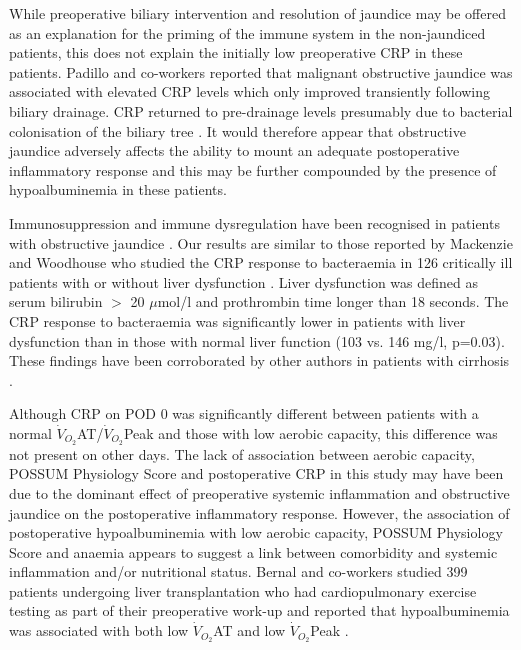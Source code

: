 While preoperative biliary intervention and resolution of jaundice may be offered as an explanation for the priming of the immune system in the non-jaundiced patients, this does not explain the initially low preoperative CRP in these patients.
Padillo and co-workers reported that malignant obstructive jaundice was associated with elevated CRP levels which only improved transiently following biliary drainage.
CRP returned to pre-drainage levels presumably due to bacterial colonisation of the biliary tree  \parencite{padillo_effect_2002, padillo_cytokines_2001}.
It would therefore appear that obstructive jaundice adversely affects the ability to mount an adequate postoperative inflammatory response and this may be further compounded by the presence of hypoalbuminemia in these patients.

Immunosuppression and immune dysregulation have been recognised in patients with obstructive jaundice \parencite{scott-conner_pathophysiology_1994}.
Our results are similar to those reported by Mackenzie and Woodhouse who studied the CRP response to bacteraemia in 126 critically ill patients with or without liver dysfunction \parencite{mackenzie_c-reactive_2006}. 
Liver dysfunction was defined as serum bilirubin $>$ 20 $\mu$mol/l and prothrombin time longer than 18 seconds. 
The CRP response to bacteraemia was significantly lower in patients with liver dysfunction than in those with normal liver function (103 vs. 146 mg/l, p=0.03). 
These findings have been corroborated by other authors in patients with cirrhosis \parencite{pieri_c-reactive_2014, janum_c-reactive_2011}.

Although CRP on POD 0 was significantly different between patients with a normal $\dot{V}_{O_2}$AT/$\dot{V}_{O_2}$Peak and those with low aerobic capacity, this difference was not present on other days. 
The lack of association between aerobic capacity, POSSUM Physiology Score and postoperative CRP in this study may have been due to the dominant effect of preoperative systemic inflammation and obstructive jaundice on the postoperative inflammatory response.
However, the association of postoperative hypoalbuminemia with low aerobic capacity, POSSUM Physiology Score and anaemia appears to suggest a link between comorbidity and systemic inflammation and/or nutritional status.
Bernal and co-workers studied 399 patients undergoing liver transplantation who had cardiopulmonary exercise testing as part of their preoperative work-up and reported that hypoalbuminemia was associated with both low $\dot{V}_{O_2}$AT and low $\dot{V}_{O_2}$Peak \parencite{bernal_aerobic_2014}.

